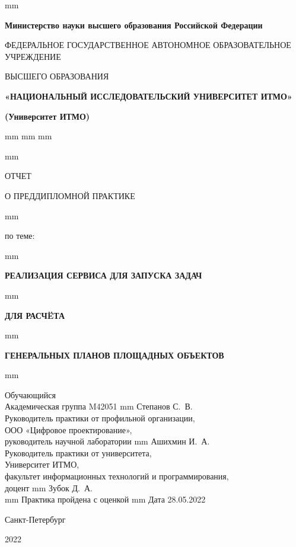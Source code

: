 \thispagestyle{empty}
 mm
\centerline{\footnotesize{\textbf{Министерство науки высшего образования Российской Федерации}}}
\centerline{\footnotesize{ФЕДЕРАЛЬНОЕ ГОСУДАРСТВЕННОЕ АВТОНОМНОЕ ОБРАЗОВАТЕЛЬНОЕ УЧРЕЖДЕНИЕ}}
\centerline{\small{ВЫСШЕГО ОБРАЗОВАНИЯ}}
\centerline{\textbf{«НАЦИОНАЛЬНЫЙ ИССЛЕДОВАТЕЛЬСКИЙ УНИВЕРСИТЕТ ИТМО»}}
\centerline{\textbf{(Университет ИТМО)}}
 mm
 mm
 mm



 mm
\centerline{\LARGE{ОТЧЕТ}}
\centerline{\LARGE{О ПРЕДДИПЛОМНОЙ ПРАКТИКЕ}}
 mm
\centerline{\large{по теме:}}
 mm
\centerline{\large\textbf{РЕАЛИЗАЦИЯ СЕРВИСА ДЛЯ ЗАПУСКА ЗАДАЧ}}
 mm
\centerline{\large\textbf{ДЛЯ РАСЧËТА }}
 mm
\centerline{\large\textbf{ГЕНЕРАЛЬНЫХ ПЛАНОВ ПЛОЩАДНЫХ ОБЪЕКТОВ}}

 mm

\noindent Обучающийся \\
Академическая группа M42051  mm Степанов С.~В.\\

\noindent Руководитель практики от профильной организации, \\
ООО «Цифровое проектирование», \\
руководитель научной лаборатории  mm Ашихмин И.~А.\\

\noindent Руководитель практики от университета, \\
Университет ИТМО, \\
факультет информационных технологий и программирования, \\
доцент  mm Зубок Д.~А.\\

 mm
\hfill {Практика пройдена с оценкой \makebox[10mm]{\hrulefill} }
 mm
\hfill Дата 28.05.2022

\vfill \hfil \break
\centerline{\large Санкт-Петербург } \centerline{ 2022 }


